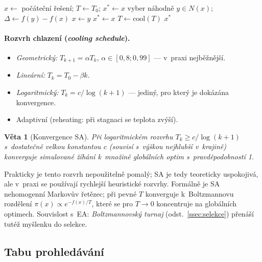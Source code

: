 \documentclass[11pt,a4paper]{article}
\newtheorem{veta}{Věta}[section]
\theoremstyle{definition}
\begin{document}
\begin{algorithm}[!ht]
\caption{Simulované žíhání}
\begin{algorithmic}[1]
\State $x \gets$ počáteční řešení; $T \gets T_0$; $x^* \gets x$
    \State vyber náhodně $y \in N(x)$; $\Delta \gets f(y) - f(x)$
     $x \gets y$ \EndIf
     $x^* \gets x$ \EndIf
  \EndFor
  \State $T \gets \mathrm{cool}(T)$
\EndWhile
\Ensure $x^*$
\end{algorithmic}
\end{algorithm}

\paragraph{Rozvrh chlazení (\emph{cooling schedule}).}
\begin{itemize}
\item \emph{Geometrický:} $T_{k+1} = \alpha T_k$, $\alpha \in [0{,}8; 0{,}99]$ ---
  v~praxi nejběžnější.
\item \emph{Lineární:} $T_k = T_0 - \beta k$.
\item \emph{Logaritmický:} $T_k = c/\log(k+1)$ --- jediný, pro který je
  dokázána konvergence.
\item Adaptivní (reheating: při stagnaci se teplota zvýší).
\end{itemize}

\begin{veta}[Konvergence SA]
Při logaritmickém rozvrhu $T_k \ge c/\log(k+1)$ s~dostatečně velkou konstantou
$c$ (souvisí s~výškou nejhlubší  v~krajině) konverguje simulované
žíhání k~množině globálních optim s~pravděpodobností 1.
\end{veta}
Prakticky je tento rozvrh nepoužitelně pomalý; SA je tedy teoreticky
uspokojivá, ale v~praxi se používají rychlejší heuristické rozvrhy. Formálně
je SA nehomogenní Markovův řetězec; při pevné $T$ konverguje k~Boltzmannovu
rozdělení $\pi(x) \propto e^{-f(x)/T}$, které se pro $T \to 0$ koncentruje
na globálních optimech. Souvislost s~EA: \emph{Boltzmannovský turnaj}
(odst.~\ref{ssec:selekce}) přenáší tutéž myšlenku do selekce.

\subsection{Tabu prohledávání}
\end{document}

